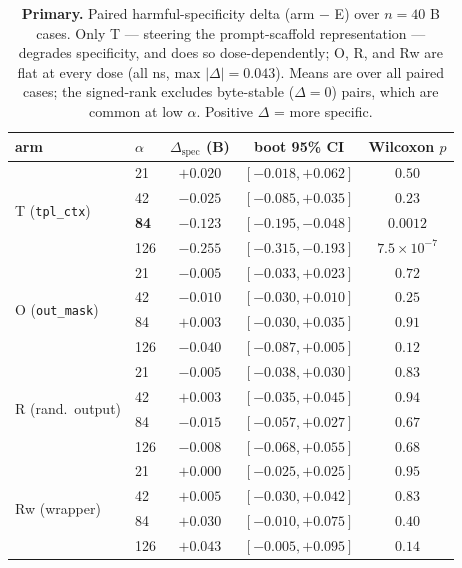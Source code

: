 \begin{table}[t]
\centering
\begin{tabular}{llccc}
\toprule
arm & $\alpha$ & $\Delta_{\text{spec}}$ (B) & boot 95\% CI & Wilcoxon $p$ \\
\midrule
\multirow{4}{*}{T (\texttt{tpl\_ctx})}
 & 21  & $+0.020$ & $[-0.018,+0.062]$ & $0.50$ \\
 & 42  & $-0.025$ & $[-0.085,+0.035]$ & $0.23$ \\
 & \textbf{84}  & $\mathbf{-0.123}$ & $[-0.195,-0.048]$ & $\mathbf{0.0012}$ \\
 & 126 & $-0.255$ & $[-0.315,-0.193]$ & $7.5\!\times\!10^{-7}$ \\
\midrule
\multirow{4}{*}{O (\texttt{out\_mask})}
 & 21  & $-0.005$ & $[-0.033,+0.023]$ & $0.72$ \\
 & 42  & $-0.010$ & $[-0.030,+0.010]$ & $0.25$ \\
 & 84  & $+0.003$ & $[-0.030,+0.035]$ & $0.91$ \\
 & 126 & $-0.040$ & $[-0.087,+0.005]$ & $0.12$ \\
\midrule
\multirow{4}{*}{R (rand.\ output)}
 & 21  & $-0.005$ & $[-0.038,+0.030]$ & $0.83$ \\
 & 42  & $+0.003$ & $[-0.035,+0.045]$ & $0.94$ \\
 & 84  & $-0.015$ & $[-0.057,+0.027]$ & $0.67$ \\
 & 126 & $-0.008$ & $[-0.068,+0.055]$ & $0.68$ \\
\midrule
\multirow{4}{*}{Rw (wrapper)}
 & 21  & $+0.000$ & $[-0.025,+0.025]$ & $0.95$ \\
 & 42  & $+0.005$ & $[-0.030,+0.042]$ & $0.83$ \\
 & 84  & $+0.030$ & $[-0.010,+0.075]$ & $0.40$ \\
 & 126 & $+0.043$ & $[-0.005,+0.095]$ & $0.14$ \\
\bottomrule
\end{tabular}
\caption{\textbf{Primary.} Paired harmful-specificity delta (arm $-$ E) over $n{=}40$ B
cases. Only T --- steering the prompt-scaffold representation --- degrades specificity,
and does so dose-dependently; O, R, and Rw are flat at every dose (all ns, max
$|\Delta|=0.043$). Means are over all paired cases; the signed-rank excludes byte-stable
($\Delta{=}0$) pairs, which are common at low $\alpha$. Positive $\Delta$ = more specific.}
\label{tab:regionsteer-primary}
\end{table}

